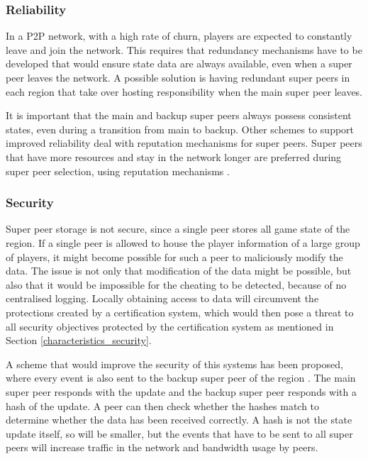 \subsubsection{Reliability}
\label{super_peer_storage_reliability}

In a P2P network, with a high rate of churn, players are expected to constantly leave and join the network. This requires that redundancy mechanisms have to be developed that would ensure state data are always available, even when a super peer leaves the network. A possible solution is having redundant super peers in each region that take over hosting responsibility when the main super peer leaves.

It is important that the main and backup super peers always possess consistent states, even during a transition from main to backup. Other schemes to support improved reliability deal with reputation mechanisms for super peers. Super peers that have more resources and stay in the network longer are preferred during super peer selection, using reputation mechanisms \cite{fan_mediator_paper}.

\subsubsection{Security}

Super peer storage is not secure, since a single peer stores all game state of the region. If a single peer is allowed to house the player information of a large group of players, it might become possible for such a peer to maliciously modify the data. The issue is not only that modification of the data might be possible, but also that it would be impossible for the cheating to be detected, because of no centralised logging. Locally obtaining access to data will circumvent the protections created by a certification system, which would then pose a threat to all security objectives protected by the certification system as mentioned in Section \ref{characteristics_security}.

A scheme that would improve the security of this systems has been proposed, where every event is also sent to the backup super peer of the region \cite{past_storage_focus}. The main super peer responds with the update and the backup super peer responds with a hash of the update. A peer can then check whether the hashes match to determine whether the data has been received correctly. A hash is not the state update itself, so will be smaller, but the events that have to be sent to all super peers will increase traffic in the network and bandwidth usage by peers.

